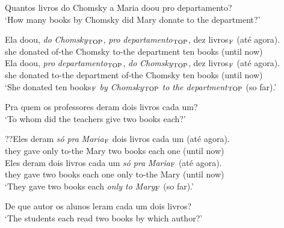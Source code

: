 \documentclass[output=paper]{langscibook}
\begin{document}
\begin{exe}
\ex \label{lacerda21}
\begin{xlist}
 \label{lacerda21A}
Quantos livros do Chomsky a Maria doou pro departamento?\\
‘How many books by Chomsky did Mary donate to the department?’

 \label{lacerda21B1}
\gll Ela 	doou, 	\emph{do} 	\emph{Chomsky}$_{\textnormal{TOP}}$, 	\emph{pro} 	\emph{departamento}$_{\textnormal{TOP}}$,	dez 	livros$_{\textnormal{F}}$ 	(até 	agora).\\
she 	donated	of-the	Chomsky	to-the 	department	ten 	books	(until	now)\\

 \label{lacerda21B2}
\gll Ela 	doou, 	\emph{pro} 	\emph{departamento}$_{\textnormal{TOP}}$,	\emph{do} 	\emph{Chomsky}$_{\textnormal{TOP}}$, 	dez 	livros$_{\textnormal{F}}$	(até 	agora).\\
she 	donated	to-the 	department 	of-the	Chomsky 	ten 	books	(until	now)\\
\glt‘She donated ten books$_{\textnormal{F}}$ \emph{by Chomsky$_{\textnormal{TOP}}$} \emph{to the department$_{\textnormal{TOP}}$} (so far).’\\


\end{xlist}

\ex \label{lacerda22}
\begin{xlist}
 \label{lacerda22A}
Pra quem os professores deram dois livros cada um?\\
‘To whom did the teachers give two books each?’

 \label{lacerda22B1}
\gll ??Eles 	deram 	\emph{só} 	\emph{pra} 	\emph{Maria$_{\textnormal{F}}$} 	dois 	livros 	cada 	um 	(até 	agora).\\
they 	gave 	only 	to-the 	Mary 	two 	books 	each 	one (until 	now)\\

 \label{lacerda22B2}
\gll Eles 	deram 	dois 	livros 	cada 	um 	\emph{só} 	\emph{pra} 	\emph{Maria}$_{\textnormal{F}}$ 	(até 	agora).\\
they 	gave 	two 	books 	each 	one 	only 	to-the 	Mary 	(until 	now)\\
\glt‘They gave two books each \emph{only to Mary$_{\textnormal{F}}$} (so far).’	\\

\end{xlist}

\ex \label{lacerda23}
\begin{xlist}
 \label{lacerda23A}
De que autor os alunos leram cada um dois livros?\\
‘The students each read two books by which author?’


\end{xlist}
\end{exe}
\end{document}
